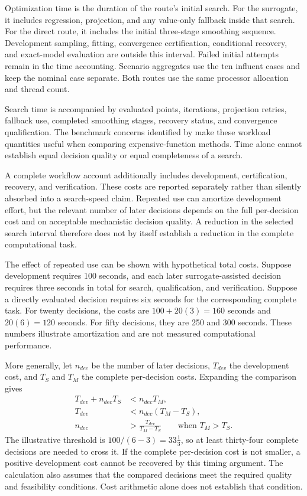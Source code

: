 Optimization time is the duration of the route's initial search. For the surrogate, it includes regression, projection, and any value-only fallback inside that search. For the direct route, it includes the initial three-stage smoothing sequence. Development sampling, fitting, convergence certification, conditional recovery, and exact-model evaluation are outside this interval. Failed initial attempts remain in the time accounting. Scenario aggregates use the ten influent cases and keep the nominal case separate. Both routes use the same processor allocation and thread count.

Search time is accompanied by evaluated points, iterations, projection retries, fallback use, completed smoothing stages, recovery status, and convergence qualification. The benchmark concerns identified by \citet{Bliek2023} make these workload quantities useful when comparing expensive-function methods. Time alone cannot establish equal decision quality or equal completeness of a search.

A complete workflow account additionally includes development, certification, recovery, and verification. These costs are reported separately rather than silently absorbed into a search-speed claim. Repeated use can amortize development effort, but the relevant number of later decisions depends on the full per-decision cost and on acceptable mechanistic decision quality. A reduction in the selected search interval therefore does not by itself establish a reduction in the complete computational task.

The effect of repeated use can be shown with hypothetical total costs. Suppose development requires 100 seconds, and each later surrogate-assisted decision requires three seconds in total for search, qualification, and verification. Suppose a directly evaluated decision requires six seconds for the corresponding complete task. For twenty decisions, the costs are $100+20(3)=160$ seconds and $20(6)=120$ seconds. For fifty decisions, they are 250 and 300 seconds. These numbers illustrate amortization and are not measured computational performance.

More generally, let $n_{dec}$ be the number of later decisions, $T_{dev}$ the development cost, and $T_S$ and $T_M$ the complete per-decision costs. Expanding the comparison gives
\[
\begin{aligned}
T_{dev}+n_{dec}T_S&<n_{dec}T_M,\\
T_{dev}&<n_{dec}(T_M-T_S),\\
n_{dec}&>\frac{T_{dev}}{T_M-T_S}\qquad\text{when }T_M>T_S.
\end{aligned}
\]
The illustrative threshold is $100/(6-3)=33\tfrac13$, so at least thirty-four complete decisions are needed to cross it. If the complete per-decision cost is not smaller, a positive development cost cannot be recovered by this timing argument. The calculation also assumes that the compared decisions meet the required quality and feasibility conditions. Cost arithmetic alone does not establish that condition.

